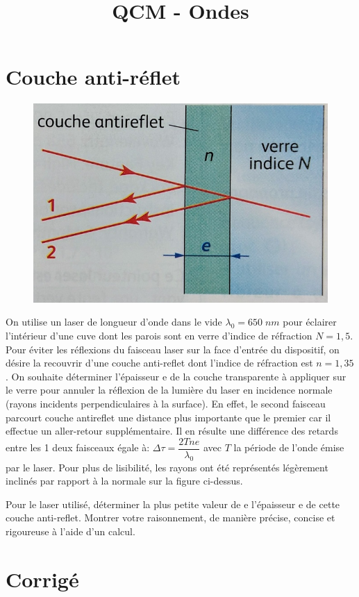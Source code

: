 \documentclass[11pt,a4paper]{article}
\title{QCM - Ondes}
\date{}
\author{}
\begin{document}
\section*{Couche anti-réflet}

\begin{figure}
    \centering
    \includegraphics[widht=0.49\textwidth]{interfere.jpg}
\end{figure}
On utilise un laser de longueur d'onde dans le vide $\lambda_0=650\; nm$ pour éclairer l'intérieur d'une cuve dont les parois sont en verre d'indice de réfraction $N=1,5$. 
Pour éviter les réflexions du faisceau laser sur la face d'entrée du dispositif, on désire la recouvrir d'une couche anti-reflet dont l'indice de réfraction est $n = 1,35$. On souhaite déterminer l'épaisseur e de la couche transparente à appliquer sur le verre pour annuler la réflexion de la lumière du laser en incidence normale (rayons incidents perpendiculaires à la surface).
En effet, le second faisceau parcourt couche antireflet une distance plus importante que le premier car il effectue un aller-retour supplémentaire. Il en résulte une différence des retards entre les 1 deux faisceaux égale à:   $\Delta \tau = \dfrac{2Tne}{\lambda_0}$  avec $T$ la période de l’onde émise par le laser. 
Pour plus de lisibilité, les rayons ont été représentés légèrement inclinés par rapport à la normale sur la figure ci-dessus. 


Pour le laser utilisé, déterminer la plus petite valeur de e l’épaisseur e de cette couche anti-reflet. Montrer votre raisonnement, de manière précise, concise et rigoureuse à l’aide d’un calcul. 

\section*{Corrigé}
\end{document}
